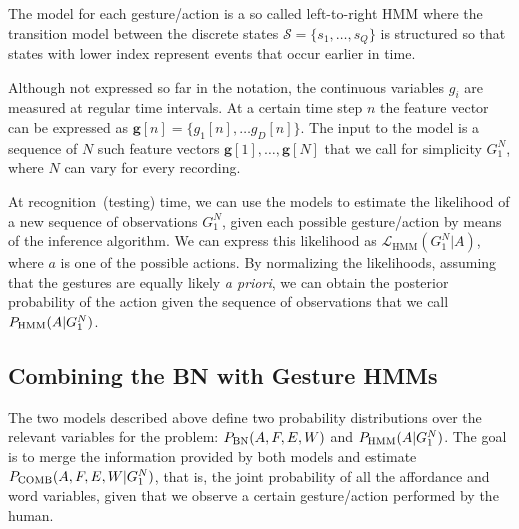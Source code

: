The model for each gesture/action is a so called left-to-right \ac{HMM} where the transition model between the discrete states $\mathcal{S} = \{s_1, \dots, s_Q\}$ is structured so that states with lower index represent events that occur earlier in time.

Although not expressed so far in the notation, the continuous variables $g_i$ are measured at regular time intervals.
At a certain time step $n$ the feature vector can be expressed as $\mathbf{g}[n] = \{g_1[n], \dots g_D[n]\}$.
The input to the model is a sequence of $N$ such feature vectors $\mathbf{g}[1], \dots, \mathbf{g}[N]$ that we call for simplicity $G_1^N$, where $N$ can vary for every recording.

At recognition~(testing) time, we can use the models to estimate the likelihood of a new sequence of observations $G_1^N$, given each possible gesture/action by means of the \FB{} inference algorithm.
We can express this likelihood as $\mathcal{L}_\text{HMM}(G_1^N|A)$, where $a$ is one of the possible actions.
By normalizing the likelihoods, assuming that the gestures are equally likely \emph{a priori}, we can obtain the posterior probability of the action given the sequence of observations that we call $P_{\text{HMM}}(A|G_1^N)$.


\newcommand{\pcomb}{\ensuremath P_\text{COMB}}
\newcommand{\xinf}{\ensuremath X_\text{INF}}
\newcommand{\xobs}{\ensuremath X_\text{OBS}}
\newcommand{\xlat}{\ensuremath X_\text{LAT}}

\subsection{Combining the \acs{BN} with Gesture \acsp{HMM}}
\label{sec:combination}
The two models described above define two probability distributions over the relevant variables for the problem:
$P_{\text{BN}}(A, F, E, W)$ and $P_{\text{HMM}}(A|G_1^N)$.
The goal is to merge the information provided by both models and estimate $\pcomb(A, F, E, W|G_1^N)$, that is, the joint probability of all the affordance and word variables, given that we observe a certain gesture/action performed by the human.

